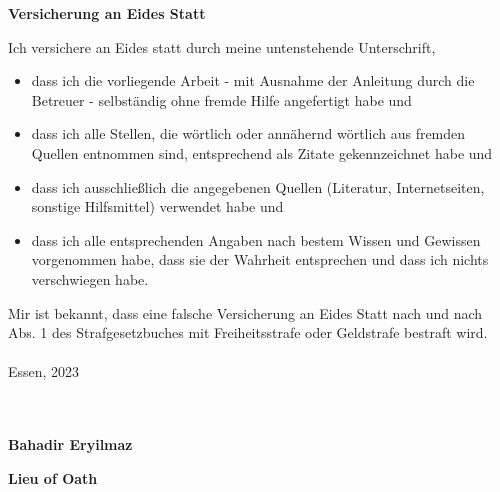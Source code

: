 \thispagestyle{empty}

\vspace*{\fill} %

\begin{center}
\textbf{Versicherung an Eides Statt}
\end{center}

Ich versichere an Eides statt durch meine untenstehende Unterschrift,
\begin{itemize}
    \item dass ich die vorliegende Arbeit - mit Ausnahme der Anleitung durch die Betreuer - selbständig ohne fremde Hilfe angefertigt habe und
    \item dass ich alle Stellen, die wörtlich oder annähernd wörtlich aus fremden Quellen entnommen sind, entsprechend als Zitate gekennzeichnet habe und
    \item dass ich ausschließlich die angegebenen Quellen (Literatur, Internetseiten, sonstige Hilfsmittel) verwendet habe und
    \item dass ich alle entsprechenden Angaben nach bestem Wissen und Gewissen vor\-genommen habe, dass sie der Wahrheit entsprechen und dass ich nichts verschwiegen habe.
\end{itemize}
Mir ist bekannt, dass eine falsche Versicherung an Eides Statt nach  und nach  Abs. 1 des Strafgesetzbuches mit Freiheitsstrafe oder Geldstrafe bestraft wird.
\\
\\
\noindent Essen, 2023
\\
\\
\begin{flushleft}
\\
\textbf{Bahadir Eryilmaz}
\end{flushleft}

\vfill %

\newpage
\thispagestyle{empty}

\vspace*{\fill} %

\begin{center}
\textbf{Lieu of Oath}
\end{center}

